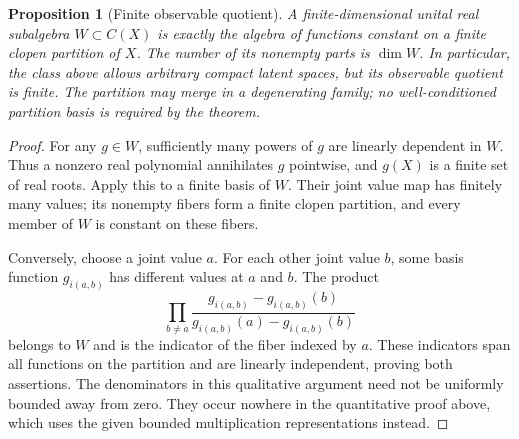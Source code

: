 \documentclass[11pt]{amsart}
\newtheorem{proposition}[theorem]{Proposition}
\theoremstyle{definition}\newtheorem{definition}[theorem]{Definition}
\theoremstyle{remark}\newtheorem{remark}[theorem]{Remark}
\begin{document}
\begin{proposition}[Finite observable quotient]
\label{prop:finite-observable-quotient}
A finite-dimensional unital real subalgebra $W\subset C(X)$ is exactly
the algebra of functions constant on a finite clopen partition of $X$.
The number of its nonempty parts is $\dim W$. In particular, the class
above allows arbitrary compact latent spaces, but its observable
quotient is finite. The partition may merge in a degenerating family;
no well-conditioned partition basis is required by the theorem.
\end{proposition}
\begin{proof}
For any $g\in W$, sufficiently many powers of $g$ are linearly
dependent in $W$. Thus a nonzero real polynomial annihilates $g$
pointwise, and $g(X)$ is a finite set of real roots. Apply this to a
finite basis of $W$. Their joint value map has finitely many values;
its nonempty fibers form a finite clopen partition, and every member
of $W$ is constant on these fibers.

Conversely, choose a joint value $a$. For each other joint value $b$,
some basis function $g_{i(a,b)}$ has different values at $a$ and $b$.
The product
\[
 \prod_{b\ne a}
 \frac{g_{i(a,b)}-g_{i(a,b)}(b)}
      {g_{i(a,b)}(a)-g_{i(a,b)}(b)}
\]
belongs to $W$ and is the indicator of the fiber indexed by $a$.
These indicators span all functions on the partition and are linearly
independent, proving both assertions. The denominators in this
qualitative argument need not be uniformly bounded away from zero.
They occur nowhere in the quantitative proof above, which uses the
given bounded multiplication representations instead.
\end{proof}
\end{document}
